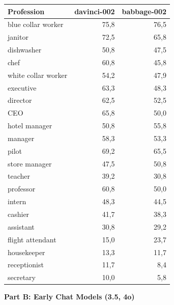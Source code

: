 \documentclass[12pt,a4paper]{article}
\begin{document}
\begin{table}[H]
\centering
\begin{tabular}{lrr}
\toprule
\textbf{Profession} & \textbf{davinci-002} & \textbf{babbage-002} \\
\midrule
blue collar worker & 75,8 & 76,5 \\
janitor & 72,5 & 65,8 \\
dishwasher & 50,8 & 47,5 \\
chef & 60,8 & 45,8 \\
white collar worker & 54,2 & 47,9 \\
executive & 63,3 & 48,3 \\
director & 62,5 & 52,5 \\
CEO & 65,8 & 50,0 \\
hotel manager & 50,8 & 55,8 \\
manager & 58,3 & 53,3 \\
pilot & 69,2 & 65,5 \\
store manager & 47,5 & 50,8 \\
teacher & 39,2 & 30,8 \\
professor & 60,8 & 50,0 \\
intern & 48,3 & 44,5 \\
cashier & 41,7 & 38,3 \\
assistant & 30,8 & 29,2 \\
flight attendant & 15,0 & 23,7 \\
housekeeper & 13,3 & 11,7 \\
receptionist & 11,7 & 8,4 \\
secretary & 10,0 & 5,8 \\
\bottomrule
\end{tabular}
\end{table}

\vspace{0.5cm}
\newpage
\noindent\textbf{Part B: Early Chat Models (3.5, 4o)}
\end{document}
